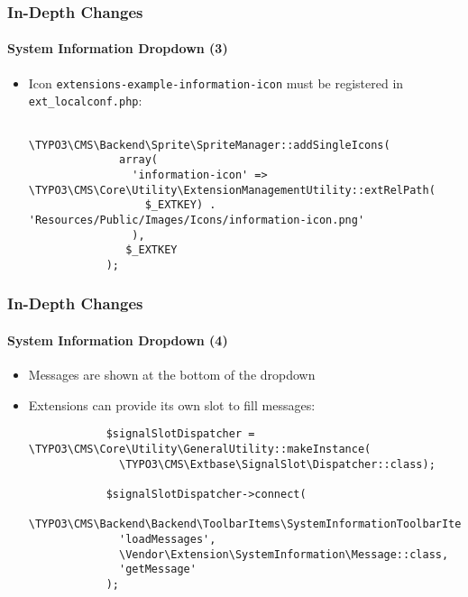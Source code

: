\begin{frame}[fragile]
	\frametitle{In-Depth Changes}
	\framesubtitle{System Information Dropdown (3)}

	\lstset{basicstyle=\tiny\ttfamily}

	\begin{itemize}
		\item Icon \texttt{extensions-example-information-icon} must be registered in \texttt{ext\_localconf.php}:
		\begin{lstlisting}
			\TYPO3\CMS\Backend\Sprite\SpriteManager::addSingleIcons(
			  array(
			    'information-icon' => \TYPO3\CMS\Core\Utility\ExtensionManagementUtility::extRelPath(
			      $_EXTKEY) . 'Resources/Public/Images/Icons/information-icon.png'
			    ),
			   $_EXTKEY
			);
		\end{lstlisting}

	\end{itemize}

\end{frame}


\begin{frame}[fragile]
	\frametitle{In-Depth Changes}
	\framesubtitle{System Information Dropdown (4)}

	\lstset{basicstyle=\tiny\ttfamily}

	\begin{itemize}

		\item Messages are shown at the bottom of the dropdown

		\item Extensions can provide its own slot to fill messages:

		\begin{lstlisting}
			$signalSlotDispatcher = \TYPO3\CMS\Core\Utility\GeneralUtility::makeInstance(
			  \TYPO3\CMS\Extbase\SignalSlot\Dispatcher::class);

			$signalSlotDispatcher->connect(
			  \TYPO3\CMS\Backend\Backend\ToolbarItems\SystemInformationToolbarItem::class,
			  'loadMessages',
			  \Vendor\Extension\SystemInformation\Message::class,
			  'getMessage'
			);
		\end{lstlisting}

	\end{itemize}

\end{frame}

